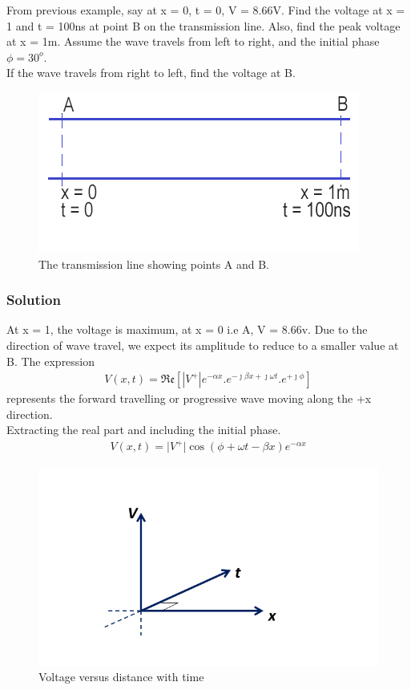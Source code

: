 \begin{exmp}
From previous example, say at x = 0, t = 0, V = 8.66V. Find the voltage at x = 1 and t = 100ns at point B on the transmission line. Also, find the peak voltage at x = 1m. Assume the wave travels from left to right, and the initial phase $\phi = 30^o$.\\
If the wave travels from right to left, find the voltage at B.
\begin{figure}[h]
\centering
\includegraphics[width=1\linewidth]{./graphics/TL}
\caption{The transmission line showing points A and B.}
\end{figure}

\subsubsection*{Solution}
At x = 1, the voltage is maximum, at x = 0 i.e A, V = 8.66v. Due to the direction of wave travel, we expect its amplitude to reduce to a smaller value at B. The expression
\begin{align}
V(x,t) = \mathfrak{Re}{[\left| V^+\right|  e^{-\alpha x}.e^{-\jmath\beta x + \jmath\omega t}.e^{+\jmath\phi}]} 
\label{eqn:voltagesoln}
\end{align}
represents the forward travelling or progressive wave moving along the +x direction.\\
Extracting the real part and including the initial phase.
\begin{align*}
V(x,t) = \lvert V^+\rvert\cos(\phi + \omega t - \beta x)e^{-\alpha x}
\end{align*}
\begin{figure}[h]
\centering
\includegraphics[width=1\linewidth]{./graphics/fig3.3}
\caption{Voltage versus distance with time}
\end{figure}


\end{exmp}
